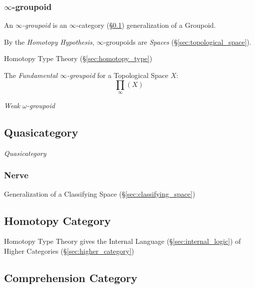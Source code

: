 \subsubsection{$\infty$-groupoid}\label{sec:infinity_groupoid}

An \emph{$\infty$-groupoid} is an $\infty$-category
(\S\ref{sec:quasicategory}) generalization of a Groupoid.

By the \emph{Homotopy Hypothesis}, $\infty$-groupoids are \emph{Spaces}
(\S\ref{sec:topological_space}).

Homotopy Type Theory (\S\ref{sec:homotopy_type})

The \emph{Fundamental $\infty$-groupoid} for a Topological Space $X$:
\[
  \prod_\infty(X)
\]

\emph{Weak $\omega$-groupoid}



\subsection{Quasicategory}\label{sec:quasicategory}

\emph{Quasicategory}



\subsubsection{Nerve}\label{sec:nerve}

Generalization of a Classifying Space (\S\ref{sec:classifying_space})



\subsection{Homotopy Category}\label{sec:homotopy_category}

Homotopy Type Theory gives the Internal Language
(\S\ref{sec:internal_logic}) of Higher Categories
(\S\ref{sec:higher_category})



\subsection{Comprehension Category}\label{sec:comprehension_category}

